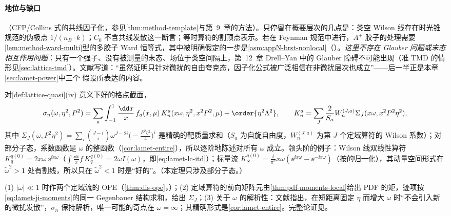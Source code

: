 \paragraph{地位与缺口}
\tagA（CFP/Collins 式的共线因子化，参见\cref{thm:method-template}与第~9~章的方法）。只停留在概要层次的几点是：类空 Wilson 线存在时光锥规范的伪极点 $1/(n_B\cdot k)$；$C_0$ 不含共线发散这一断言；等时算符的割顶点表示。若在 Feynman 规范中进行，$A^+$ 胶子的处理需要\cref{lem:method-ward-multi}型的多胶子 Ward 恒等式，其中被明确假定的一步是\cref{asm:appN-brst-nonlocal}（\tagC）。\emph{这里不存在 Glauber 问题或末态相互作用问题}：只有一个强子、没有被测量的末态、场位于类空间隔上，第~12~章 Drell--Yan 中的 Glauber 障碍不可能出现（准 TMD 的情形见\cref{sec:lattice-tmd}）。文献\cite{JiEtAl2021}写道：“虽然证明只针对微扰的自由夸克态，因子化公式被广泛相信在非微扰层次也成立”——后一半正是本章\cref{sec:lamet-power}中三个 \tagC 假设所表达的内容。

\begin{theorem}\label{thm:lamet-lcs}
对\cref{def:lattice-quasi}(iv) 意义下好的格点截面，
\begin{equation}\label{eq:lamet-lcs}
\sigma_n(\omega,\eta^2,P^2)=\sum_a\int_{-1}^1\frac{\dd x}x\,f_a(x,\mu)\,K^a_n(x\omega,\eta^2,x^2P^2,\mu)+\order{\eta^2\Lambda^2},\qquad
K^a_n=\sum_J\frac2{S_a}W^{(J,a)}_n\Sigma_J(x\omega,x^2P^2\eta^2),
\end{equation}
其中 $\Sigma_J(\omega,P^2\eta^2)=\sum_i\binom{J-i}i\omega^{J-2i}\big(-\frac{P^2\eta^2}4\big)^i$ 是精确的靶质量求和（$S_a$ 为自旋自由度，$W^{(J,a)}_n$ 为第 $J$ 个定域算符的 Wilson 系数）；对部分子态，系数函数是 $\omega$ 的整函数（\cref{cor:lamet-entire}），所以逐阶地陈述对所有 $\omega$ 成立。领头阶的例子：Wilson 线双线性算符 $K^{q(0)}_q=2x\omega\,\ee^{\ii x\omega}$（$\int\frac{\dd x}x f\,K^{q(0)}_q=2\omega I(\omega)$，即\cref{eq:lamet-lc-itd}）；标量流 $K^{q(0)}_S=\frac{\ii}{\pi^2}x\omega(\ee^{\ii x\omega}-\ee^{-\ii x\omega})$（按\cite{MaQiu2018}的归一化），其动量空间形式在 $\tilde\omega^2>1$ 处有割线，所以只在 $\tilde\omega^2<1$ 时是“好的”。（本定理只涉及部分子态。）
\end{theorem}

\begin{proofsketch}
(1) $|\omega|\ll1$ 时作两个定域流的 OPE（\cref{thm:dis-ope}，\tagA）；(2) 定域算符的前向矩阵元由\cref{thm:pdf-moments-local}给出 PDF 的矩，迹项按\cref{eq:lamet-ji-moments}的同一 Gegenbauer 结构求和，给出 $\Sigma_J$；(3) 关于 $\omega$ 的解析性：文献\cite{MaQiu2018}指出，在短距离固定 $\eta$ 而增大 $\omega$ 时“不会引入新的微扰发散”，$\sigma_n$ 保持解析，唯一可能的奇点在 $\omega=\infty$；其精确形式是\cref{cor:lamet-entire}。完整论证见\cite{MaQiu2018}。
\end{proofsketch}


